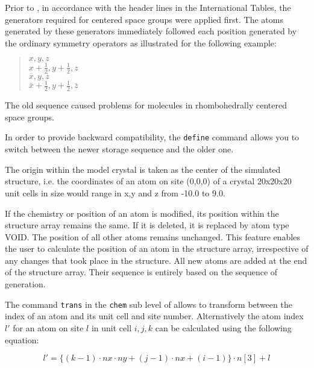 Prior to , in accordance with the header lines in
the International Tables,
the generators required for centered space groups were applied first.
The atoms generated by these generators immediately followed each
position generated by the ordinary symmetry operators as illustrated
for the following example:

\begin{quote}
       $x,y,z$\\
       $x+\frac{1}{2},y+\frac{1}{2},z$\\
       $\overline{x},y,\overline{z}$\\
       $\overline{x}+\frac{1}{2},y+\frac{1}{2},\overline{z}$
\end{quote}

The old sequence caused problems for molecules in rhombohedrally
centered space groups. 

In order to provide backward compatibility, the {\tt define}
command allows you to switch between the newer storage sequence
and the older one.

The origin within the model crystal is taken as the center of the
simulated structure, i.e.  the coordinates of an atom on site
(0,0,0) of a crystal 20x20x20 unit cells in size would range in x,y
and z from -10.0 to 9.0.
\par

If the chemistry or position of an atom is modified, its position
within the structure array remains the same.  If it is deleted, it
is replaced by atom type VOID.  The position of all other atoms
remains unchanged.  This feature enables the user to calculate the
position of an atom in the structure array, irrespective of any
changes that took place in the structure.  All new atoms are added
at the end of the structure array. Their sequence is entirely based
on the sequence of generation. \par

The command {\tt trans} in the {\tt chem} sub level of \Discus
allows to transform between the index of an atom and its unit cell
and site number. Alternatively the atom index $l'$ for an atom on
site $l$ in unit cell $i,j,k$ can be calculated using the following
equation:

\begin{equation}
        l' = \{ (k-1) \cdot nx \cdot ny +
                (j-1) \cdot nx +
                (i-1) \} \cdot n[3] + l
        \label{struc-store-eq}
\end{equation}

